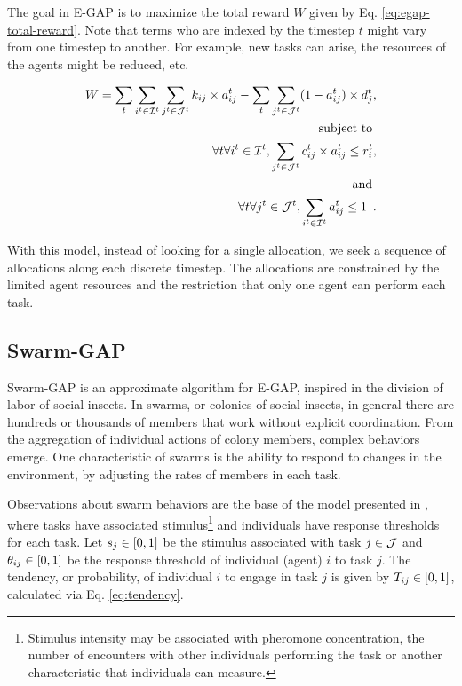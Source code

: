 \documentclass[conference]{IEEEtran}
\begin{document}
The goal in E-GAP is to maximize the total reward $W$ given by Eq. \ref{eq:egap-total-reward}. Note that terms who are indexed by the timestep $t$ might vary from one timestep to another. For example, new tasks can arise, the resources of the agents might be reduced, etc.

\begin{equation}
\label{eq:egap-total-reward}
\begin{split}
W = \sum_t \sum_{i^t \in \agentset^t} \sum_{j^t \in \taskset^t} \agtcap{i}{j} \times a_{ij}^t - 
\sum_t \sum_{j^t \in \taskset^t}(1 - a_{ij}^t) \times d_j^t ,\\
\text{ subject to }\\
\forall t \forall i^t \in \agentset^t, \sum_{j^t \in \taskset^t} \rescspt{i}{j}^t \times a_{ij}^t \leq \agtres{i}^t ,\\
\text{ and }\\
\forall t \forall j^t \in \taskset^t, \sum_{i^t \in \agentset^t} a_{ij}^t \leq 1 \enspace .
\end{split}
\end{equation}

With this model, instead of looking for a single allocation, we seek a sequence of allocations along each discrete timestep. The allocations are constrained by the limited agent resources and the restriction that only one agent can perform each task.

\subsection{Swarm-GAP}
\label{sec:swarmgap}

Swarm-GAP is an approximate algorithm for E-GAP, inspired in the division of labor of social insects. In swarms, or colonies of social insects, in general there are hundreds or thousands of members that work without explicit coordination. From the aggregation of individual actions of colony members, complex behaviors emerge. One characteristic of swarms is the ability to respond to changes in the environment, by adjusting the rates of members in each task.

Observations about swarm behaviors are the base of the model presented in \cite{Theraulaz+1998}, where tasks have associated stimulus\footnote{Stimulus intensity may be associated with pheromone concentration, the number of encounters with other individuals performing the task or another characteristic that individuals can measure.} and individuals have response thresholds for each task. Let $s_j \in [0,1]$ be the stimulus associated with task $j \in \mathcal{J}$ and $\theta_{ij} \in [0,1]$ be the response threshold of individual (agent) $i$ to task $j$. The tendency, or probability, of individual $i$ to engage in task $j$ is given by $T_{ij} \in [0,1]$, calculated via Eq. \ref{eq:tendency}.
\end{document}
